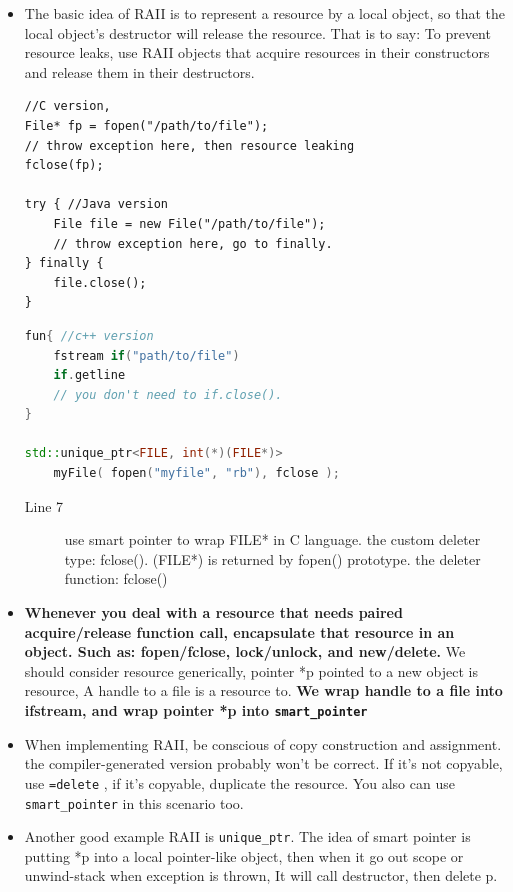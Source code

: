 \documentclass[a4paper,11pt,twoside]{book}
\begin{document}
\begin{itemize}
		\item The basic idea of RAII is to represent a resource by a local object, so that the local object's destructor will release the resource.  That is to say: To prevent resource leaks, use RAII objects that acquire resources in their constructors and release them in their destructors.
\begin{lstlisting}[numbers = none]
//C version,
File* fp = fopen("/path/to/file");
// throw exception here, then resource leaking
fclose(fp);
	
try { //Java version
	File file = new File("/path/to/file");
	// throw exception here, go to finally.
} finally {
	file.close();
}
\end{lstlisting}
	
\begin{lstlisting}[frame=single, language=c++]
fun{ //c++ version
	fstream if("path/to/file")
	if.getline
	// you don't need to if.close().
}
	
std::unique_ptr<FILE, int(*)(FILE*)> 
	myFile( fopen("myfile", "rb"), fclose );              
\end{lstlisting}

\begin{description}
	\item[Line 7] use smart pointer to wrap FILE* in C language. the custom deleter type: fclose(). (FILE*) is returned by fopen() prototype. the deleter function: fclose() 
\end{description}
			
	\item \textbf{Whenever you deal with a resource that needs paired acquire/release function call, encapsulate that resource in an object.  Such as: fopen/fclose, lock/unlock, and new/delete.} We should consider resource generically, pointer *p pointed to a new object is resource, A handle to a file is a resource to. \textbf{We wrap handle to a file into ifstream, and wrap pointer *p into \texttt{smart\_pointer}}

	\item When implementing RAII, be conscious of copy construction and assignment. the compiler-generated version probably won't be correct. If it's not copyable, use \texttt{=delete} , if it's copyable, duplicate the resource.  You also can use \texttt{smart\_pointer} in this scenario too.
	
		\item Another good example RAII is \texttt{unique\_ptr}. The idea of smart pointer is putting *p into a local pointer-like object, then when it go out scope or unwind-stack when exception is thrown, It will call destructor, then delete p.


\end{itemize}
\end{document}
